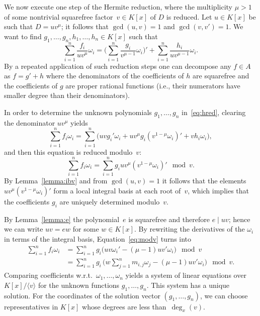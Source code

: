 \documentclass[final,1p,times,authoryear]{elsarticle}
\def\<#1>{\langle#1\rangle}
\begin{document}
We now execute one step of the Hermite reduction, where the multiplicity
$\mu>1$ of some nontrivial squarefree factor~$v\in K[x]$ of $D$ is reduced.
Let $u\in K[x]$ be such that $D=uv^\mu$; it follows that $\gcd(u,v)=1$ and
$\gcd(v,v')=1$. We want to find $g_1,\ldots,g_n,h_1,\ldots,h_n\in K[x]$
such that
\begin{equation}\label{eq:hred}
  \sum_{i=1}^n \frac{f_i}{uv^\mu}\omega_i =
  \biggl(\sum_{i=1}^n\frac{g_i}{v^{\mu-1}}\omega_i\biggr)' +
  \sum_{i=1}^n \frac{h_i}{uv^{\mu-1}}\omega_i.
\end{equation}
By a repeated application of such reduction steps one can decompose any $f\in A$
as $f=g'+h$ where the denominators of the coefficients of $h$ are squarefree
and the coefficients of $g$ are proper rational functions (i.e., their numerators
have smaller degree than their denominators).

In order to determine the unknown polynomials $g_1,\ldots,g_n$ in~\eqref{eq:hred},
clearing the denominator $uv^\mu$ yields
\begin{equation}\label{eq:clear}
  \sum_{i=1}^n f_i\omega_i = \sum_{i=1}^n \biggl( uvg_i'\omega_i +
  uv^\mu g_i\left(v^{1-\mu}\omega_i\right)' + vh_i\omega_i \biggr),
\end{equation}
and then this equation is reduced modulo~$v$:
\begin{equation}\label{eq:modv}
  \sum_{i=1}^n f_i\omega_i =
  \sum_{i=1}^n g_iuv^\mu\left(v^{1-\mu}\omega_i\right)' \mod v.
\end{equation}
By Lemma~\ref{lemma:ibv} and from $\gcd(u,v)=1$ it follows that
the elements $uv^\mu\left(v^{1-\mu}\omega_i\right)'$ form a local integral basis
at each root of~$v$, which implies that the coefficients $g_i$ are
uniquely determined modulo~$v$.

By Lemma~\ref{lemma:e} the polynomial~$e$ is squarefree and therefore $e\mid uv$;
hence we can write $uv=ew$ for some $w\in K[x]$. By rewriting the
derivatives of the $\omega_i$ in terms of the integral basis,
Equation~\eqref{eq:modv} turns into
\begin{align*}
  \sum_{i=1}^n f_i\omega_i
  &= \sum_{i=1}^n g_i \bigl( uv\omega_i' - (\mu-1)uv'\omega_i \bigr) \mod v\\
  &= \sum_{i=1}^n g_i\, \biggl( w\sum_{j=1}^n m_{i,j}\omega_j - (\mu-1)uv'\omega_i \biggr) \mod v.
\end{align*}
Comparing coefficients w.r.t.\ $\omega_1,\ldots,\omega_n$ yields a
system of linear equations over $K[x]/\<v>$ for the unknown
functions $g_1,\ldots,g_n$. This system has
a unique solution. For the coordinates of the solution vector $(g_1,\dots,g_n)$,
we can choose representatives in $K[x]$ whose degrees are less than~$\deg_x(v)$.
\end{document}
